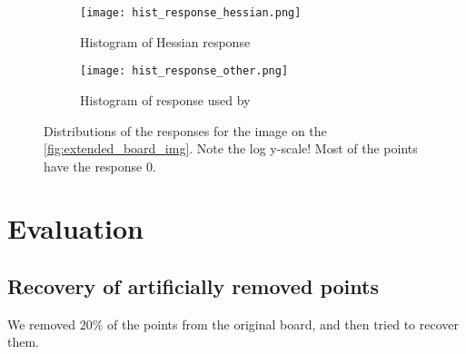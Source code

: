 \begin{figure}
	\centering
	\begin{subfigure}[t]{0.45\linewidth}
		\texttt{[image: hist\_response\_hessian.png]}
		\caption{Histogram of Hessian response}
	\end{subfigure}
	\begin{subfigure}[t]{0.45\linewidth}
		\texttt{[image: hist\_response\_other.png]}
		\caption{Histogram of response used by \cite{geigerAutomaticCameraRange2012}}
	\end{subfigure}
	\caption{Distributions of the responses for the image on the
		\cref{fig:extended_board_img}. Note the log y-scale! Most of the points have
		the response 0.}
\end{figure}

\section{Evaluation}\label{sec:evaluation}

\subsection{Recovery of artificially removed points}\label{sub:recovery_of_artificially_removed_points}

We removed 20\% of the points from the original board, and then tried to recover
them.

